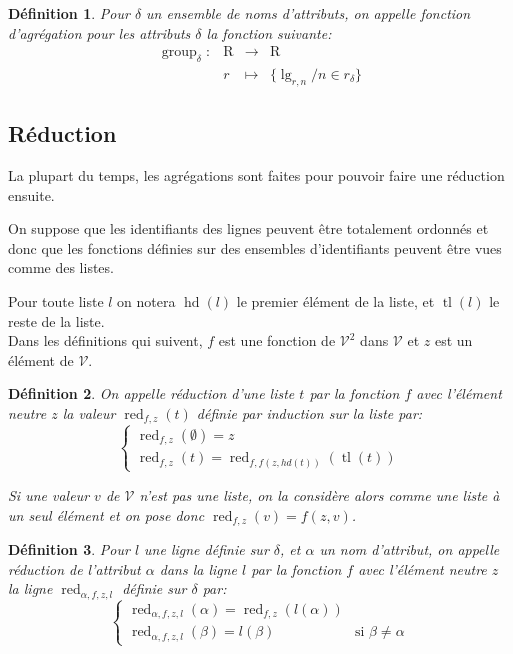 \documentclass[french]{article}
\DeclareMathOperator{\group}{group}
\DeclareMathOperator{\R}{R}
\DeclareMathOperator{\lgr}{lg}
\DeclareMathOperator{\redu}{red}
\DeclareMathOperator{\head}{hd}
\DeclareMathOperator{\tail}{tl}
\newcommand{\groupDelta}{\group_{\delta}}
\newcommand{\val}{\mathcal{V}}
\newtheorem{defi}{Définition}
\begin{document}
\begin{defi}
	Pour $\delta$ un ensemble de noms d'attributs,
	on appelle \emph{fonction d'agrégation pour les attributs $\delta$}
	la fonction suivante:
	$$
	\begin{array}{llcl}
	\groupDelta: & \R & \rightarrow &  \R \\
			& r & \mapsto & \{ \lgr_{r,n} / n \in r_\delta \}
	\end{array}
	$$
\end{defi}

\subsection*{Réduction}
La plupart du temps, les agrégations sont faites pour pouvoir faire une
réduction ensuite.

On suppose que les identifiants des lignes peuvent être totalement ordonnés
et donc que les fonctions définies sur des ensembles d'identifiants peuvent
être vues comme des listes.

Pour toute liste $l$ on notera $\head(l)$ le premier élément de la liste,
et $\tail(l)$ le reste de la liste. \\

Dans les définitions qui suivent, $f$ est une fonction de $\val^2$ dans $\val$
et $z$ est un élément de $\val$.

\begin{defi}
	On appelle
	\emph{réduction d'une liste $t$ par la fonction $f$ avec l'élément neutre $z$}
	la valeur $\redu_{f, z}(t)$ définie par induction sur la liste par:
	$$
	\left\lbrace
	\begin{array}{l}
	\redu_{f,z}(\emptyset) = z \\
	\redu_{f,z}(t) = \redu_{f , f(z, hd(t))}(\tail(t))
	\end{array}
	\right.
	$$
	
	Si une valeur $v$ de $\val$ n'est pas une liste,
	on la considère alors comme une liste à un seul
	élément et on pose donc $\redu_{f,z}(v) = f(z,v)$.
\end{defi}

\begin{defi}
	Pour $l$ une ligne définie sur $\delta$,
	et $\alpha$ un nom d'attribut,
	on appelle
	\emph{réduction de l'attribut $\alpha$ dans la ligne $l$ 
		par la fonction $f$ avec l'élément neutre $z$}
	la ligne $\redu_{\alpha, f, z, l}$ définie sur $\delta$ par:
	$$
	\left\lbrace
	\begin{array}{ll}
	\redu_{\alpha, f, z, l}(\alpha) = \redu_{f,z}(l(\alpha)) & \\
	\redu_{\alpha, f, z, l}(\beta) = l(\beta) & \text{si $\beta \neq \alpha$}
	\end{array}
	\right.
	$$
\end{defi}
\end{document}

